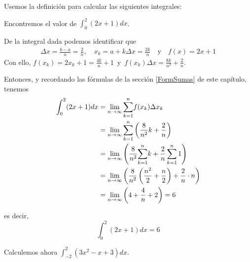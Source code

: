 \begin{ejemplo}
Usemos la definición para calcular las siguientes integrales:
\end{ejemplo}
\begin{parrafonumerado}

\item Encontremos el valor de $\int_{0}^{2}(2x+1)dx$.

De la integral dada podemos identificar que
\begin{align*}
\Delta x=\frac{b-a}{n}=\frac{2}{n},\quad
x_{k}=a+k\Delta x = \frac{2k}{n}\quad\text{y} \quad
f\left( x\right) = 2x+1
\end{align*}
Con ello, $f\left( x_{k}\right)=2x_{k}+1=\frac{4k}{n}+1$\ y\ $f(x_{k})\Delta x=\frac{8k}{n^{2}}+\frac{2}{n}$.

Entonces, y recordando las fórmulas de la sección \ref{FormSumas} de este capítulo, tenemos
\begin{gather*}
\begin{aligned}
\int_{0}^{2}(2x+1)dx&=\lim_{n\to\infty}\overset{n}{%
\underset{k=1}{\sum }}f(x_{k})\Delta x_{k} \\
&=\lim_{n\to\infty}\sum_{k=1}^{n}
\left( \frac{8}{n^{2}}k+\frac{2}{n}\right) \\
&=\lim_{n\to\infty}\left( \frac{8}{n^{2}}\overset{n}{
\underset{k=1}{\sum }}k+\frac{2}{n}\sum_{k=1}^{n}1\right)\\
&=\lim_{n\to\infty}\left( \frac{8}{n^{2}}\left( \frac{n^{2}}{2}+\frac{n}{2}\right) +\frac{2}{n}\cdot n\right) \\
&=\lim_{n\to\infty}\left( 4+\frac{4}{n}+2\right) =6
\end{aligned}
\end{gather*}

es decir,
\[
\int_{0}^{2}(2x+1)dx=6
\]

\item Calculemos ahora $\int_{-2}^{2}(3x^{2}-x+3)dx$.


\end{parrafonumerado}
